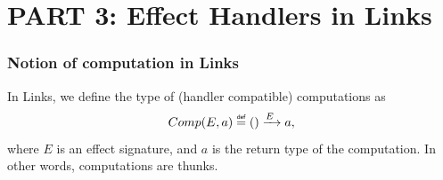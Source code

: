 
\section{PART 3: Effect Handlers in Links}

\begin{frame}
  \frametitle{Notion of computation in Links}
In Links, we define the type of (handler compatible) computations as
\[
  Comp(E,a) \defas () \xrightarrow{E\;} a,
\]
where $E$ is an effect signature, and $a$ is the return type of the computation.
In other words, computations are thunks.
\end{frame}

